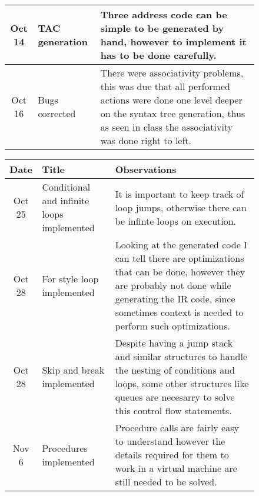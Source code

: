 \begin{figure}[h]
\begin{tabular}{cp{1.25in}p{2.5in}}
        \midrule
        Oct 14 & TAC generation &
        Three address code can be simple to be generated by hand, however to
        implement it has to be done carefully.\\

        \midrule
        Oct 16 & Bugs corrected &
        There were associativity problems, this was due that all performed
        actions were done one level deeper on the syntax tree generation, thus
        as seen in class the associativity was done right to left.\\

        \bottomrule
    \end{tabular}
\end{figure}

\begin{figure}[h]
    \centering
    \begin{tabular}{cp{1.25in}p{2.5in}}
        \toprule
        \textbf{Date} & \textbf{Title} & \textbf{Observations}\\
        \midrule
        Oct 25 & Conditional and \newline infinite loops \newline implemented &
        It is important to keep track of loop jumps, otherwise there can be
        infinte loops on execution.\\

        \midrule
        Oct 28 & For style loop \newline implemented &
        Looking at the generated code I can tell there are optimizations that
        can be done, however they are probably not done while generating the
        IR code, since sometimes context is needed to perform such
        \newline optimizations.\\

        \midrule
        Oct 28 & Skip and break \newline implemented &
        Despite having a jump stack and similar structures to handle the
        nesting of conditions and loops, some other structures like queues are
        necesarry to solve this control flow statements.\\

        \midrule
        Nov  6 & Procedures \newline implemented &
        Procedure calls are fairly easy to understand however the details
        required for them to work in a virtual machine are still needed to be
        solved.\\


\end{tabular}
\end{figure}
